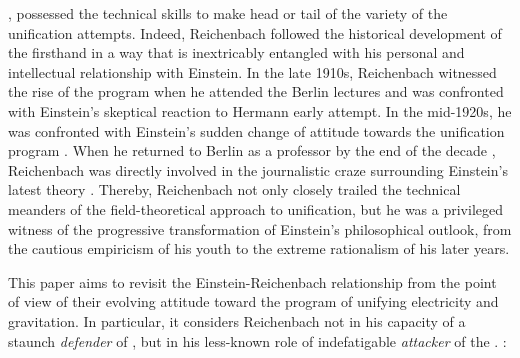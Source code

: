 \documentclass[draft]{article}
\begin{document}

, possessed the technical skills to make head or tail of the variety of the unification attempts. Indeed, Reichenbach followed the historical development of the \uftp firsthand in a way that is inextricably entangled with his personal and intellectual relationship with Einstein. In the late 1910s, Reichenbach witnessed  the rise of the program when he attended the Berlin lectures and was confronted with Einstein's skeptical reaction to Hermann  early attempt. In the mid-1920s, he was confronted with Einstein's sudden change of attitude towards the unification program \citep[188]{Vizgin1994}. When he returned to Berlin as a professor by the end of the decade , Reichenbach was directly involved in the journalistic craze surrounding Einstein's latest theory \citep{Sauer2006}. Thereby, Reichenbach not only closely trailed the technical meanders of the field-theoretical approach to unification, but he was a privileged witness of the progressive transformation of Einstein's philosophical outlook, from the cautious empiricism of his youth to the extreme rationalism of his later years. 

This paper aims to revisit the Einstein-Reichenbach relationship from the point of view of their evolving attitude toward the program of unifying electricity and gravitation. In particular, it considers Reichenbach not in his capacity of a staunch \emph{defender} of \rt \citep{Hentschel1982,Reichenbach2006}, but in his less-known role of indefatigable \emph{attacker} of the \uftp. :
\end{document}
